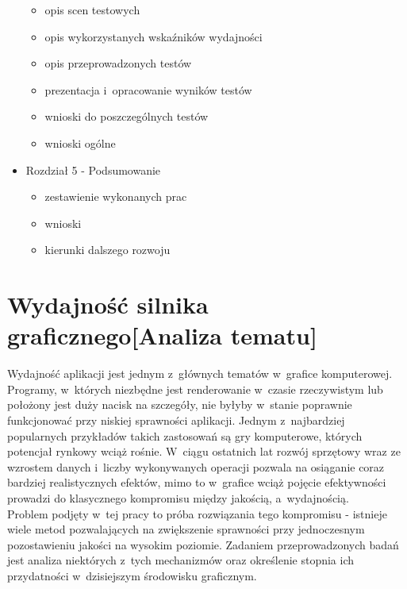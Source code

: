 \documentclass[a4paper,twoside,12pt]{book}
\begin{document}
\begin{itemize}
\begin{itemize}
        \item opis scen testowych
        \item opis wykorzystanych wskaźników wydajności
        \item opis przeprowadzonych testów
        \item prezentacja i~opracowanie wyników testów
        \item wnioski do poszczególnych testów
        \item wnioski ogólne
    \end{itemize}
    \item Rozdział 5 - Podsumowanie \\
    \begin{itemize}
        \item zestawienie wykonanych prac
        \item wnioski
        \item kierunki dalszego rozwoju
    \end{itemize}
\end{itemize}


\chapter{Wydajność silnika graficznego[Analiza tematu]}
\label{chapter:analiza}

Wydajność aplikacji jest jednym z~głównych tematów w~grafice komputerowej. Programy, w~których niezbędne jest renderowanie w~czasie rzeczywistym lub położony jest duży nacisk na szczegóły, nie byłyby w~stanie poprawnie funkcjonować przy niskiej sprawności aplikacji. Jednym z~najbardziej popularnych przykładów takich zastosowań są gry komputerowe, których potencjał rynkowy wciąż rośnie. W~ciągu ostatnich lat rozwój sprzętowy wraz ze wzrostem danych i~liczby wykonywanych operacji pozwala na osiąganie coraz bardziej realistycznych efektów, mimo to w~grafice wciąż pojęcie efektywności prowadzi do klasycznego kompromisu między jakością, a~wydajnością. \cite{trapp} \\
Problem podjęty w~tej pracy to próba rozwiązania tego kompromisu - istnieje wiele metod pozwalających na zwiększenie sprawności przy jednoczesnym pozostawieniu jakości na wysokim poziomie. Zadaniem przeprowadzonych badań jest analiza niektórych z~tych mechanizmów oraz określenie stopnia ich przydatności w~dzisiejszym środowisku graficznym. \\
\end{document}
